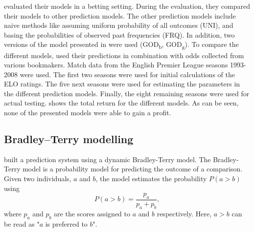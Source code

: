 \citet{bib:hvattum-arntzen-2010} evaluated their models in a betting setting. During the evaluation, they compared their models to other prediction models. The other prediction models include naive methods like assuming uniform probability of all outcomes (UNI), and basing the probabilities of observed past frequencies (FRQ). In addition, two versions of the model presented in \citet{bib:goddard-2005} were used (GOD\textsubscript{b}, GOD\textsubscript{g}). To compare the different models, \citet{bib:hvattum-arntzen-2010} used their predictions in combination with odds collected from various bookmakers. Match data from the English Premier League seasons 1993-2008 were used. The first two seasons were used for initial calculations of the ELO ratings. The five next seasons were used for estimating the parameters in the different prediction models. Finally, the eight remaining seasons were used for actual testing.  shows the total return for the different models. As can be seen, none of the presented models were able to gain a profit.

\subsection{Bradley–Terry modelling}

\citet{bib:cattelan-varin-firth-2013} built a prediction system using a dynamic Bradley-Terry model. The Bradley-Terry model is a probability model for predicting the outcome of a comparison. Given two individuals, $a$ and $b$, the model estimates the probability $P(a > b)$ using
\begin{equation}
    P(a > b) = \frac{p_{a}}{p_{a} + p_{b}},
    \label{eq:bradley-terry-model}
\end{equation}
where $p_{a}$ and $p_{b}$ are the scores assigned to $a$ and $b$ respectively. Here, $a > b$ can be read as "$a$ is preferred to $b$".


